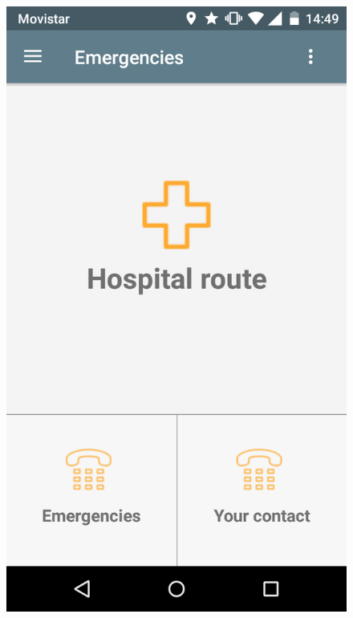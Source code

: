 \begin{itemize}
\clearpage

\begin{figure}[!h]
\centering
\includegraphics[scale=0.15]{Figures/emergencies.png}

\end{figure}
\end{itemize}
